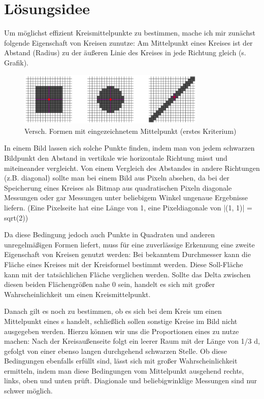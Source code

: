 \section{Lösungsidee}
Um möglichst effizient Kreismittelpunkte zu bestimmen, mache ich mir zunächst folgende Eigenschaft von Kreisen zunutze: Am Mittelpunkt eines Kreises ist der Abstand (Radius) zu der äußeren Linie des Kreises in jede Richtung gleich (s. Grafik).

\begin{figure}[!ht]
	\centering	
	\includegraphics[width=0.8\textwidth]{durchmesservergleich}
	\caption{Versch. Formen mit eingezeichnetem Mittelpunkt (erstes Kriterium)}
\end{figure}

In einem Bild lassen sich solche Punkte finden, indem man von jedem schwarzen Bildpunkt den Abstand in vertikale wie horizontale Richtung misst und miteineander vergleicht. Von einem Vergleich des Abstandes in andere Richtungen (z.B. diagonal) sollte man bei einem Bild aus Pixeln absehen, da bei der Speicherung eines Kreises als Bitmap aus quadratischen Pixeln diagonale Messungen oder gar Messungen unter beliebigem Winkel ungenaue Ergebnisse liefern. (Eine Pixelseite hat eine Länge von 1, eine Pixeldiagonale von |(1, 1)| = sqrt(2))

Da diese Bedingung jedoch auch Punkte in Quadraten und anderen unregelmäßigen Formen liefert, muss für eine zuverlässige Erkennung eine zweite Eigenschaft von Kreisen genutzt werden: Bei bekanntem Durchmesser kann die Fläche eines Kreises mit der Kreisformel bestimmt werden. Diese Soll-Fläche kann mit der tatsächlichen Fläche verglichen werden. Sollte das Delta zwischen diesen beiden Flächengrößen nahe 0 sein, handelt es sich mit großer Wahrscheinlichkeit um einen Kreismittelpunkt.

Danach gilt es noch zu bestimmen, ob es sich bei dem Kreis um einen Mittelpunkt eines \task{}s handelt, schließlich sollen sonstige Kreise im Bild nicht ausgegeben werden. Hierzu können wir uns die Proportionen eines  zu nutze machen: Nach der Kreisaußenseite folgt ein leerer Raum mit der Länge von 1/3 d, gefolgt von einer ebenso langen durchgehend schwarzen Stelle. Ob diese Bedingungen ebenfalls erfüllt sind, lässt sich mit großer Wahrscheinlichkeit ermitteln, indem man diese Bedingungen vom Mittelpunkt ausgehend rechts, links, oben und unten prüft. Diagionale und beliebigwinklige Messungen sind nur schwer möglich.

